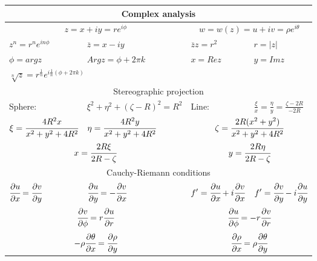 \begin{tabular}{l|l|l|l}
	\multicolumn{4}{c}{Complex analysis} \\
	\hline 
	
	\multicolumn{2}{c}{$\displaystyle z = x+iy = re^{i\phi}$}  &
	\multicolumn{2}{c}{$\displaystyle w = w(z) = u + iv = \rho e^{i\theta}$}  \\
	\hline
	
	$\displaystyle z^n = r^ne^{in\phi}$ &
	$\displaystyle \overline{z} = x - iy$ &
	$\displaystyle \overline{z}z = r^2$ &
	$\displaystyle r = |z|$ \\
	
	$\displaystyle \phi = {arg}z$ &
	$\displaystyle Argz = \phi + 2\pi k$ &
	$\displaystyle x = Rez$ &
	$\displaystyle y = Imz$ \\
	
	\multicolumn{4}{l}{$\displaystyle \sqrt[n]{z} = r^{\frac{1}{n}}e^{i\frac{1}{n}(\phi+2\pi k)}$} \\
	\hline
	
	\multicolumn{4}{c}{Stereographic projection} \\
	
	Sphere: & $\displaystyle \xi^2 + \eta^2+(\zeta - R)^2 = R^2$ &
	Line: & $\displaystyle \frac{\xi}{x} = \frac{\eta}{y} = \frac{\zeta - 2R}{-2R}$ \\
	
	$\displaystyle \xi = \cfrac{4R^2x}{x^2+y^2+4R^2}$ &
	$\displaystyle \eta = \cfrac{4R^2y}{x^2+y^2+4R^2}$ &
	\multicolumn{2}{c}{$\displaystyle \zeta = \cfrac{2R(x^2+y^2)}{x^2+y^2+4R^2}$} \\
	
	\multicolumn{2}{c}{$\displaystyle x = \cfrac{2R\xi}{2R-\zeta}$} &
	\multicolumn{2}{c}{$\displaystyle y = \cfrac{2R\eta}{2R-\zeta}$} \\
	\hline
	
	\multicolumn{4}{c}{Cauchy-Riemann conditions} \\
	
	$\displaystyle \cfrac{\partial u}{\partial x} = \cfrac{\partial v}{\partial y}$ &
	$\displaystyle \cfrac{\partial u}{\partial y} = -\cfrac{\partial v}{\partial x}$ &
	$\displaystyle f'=\cfrac{\partial u}{\partial x} + i\cfrac{\partial v}{\partial x}$ &
	$\displaystyle f' = \cfrac{\partial v}{\partial y} - i\cfrac{\partial u}{\partial y}$ \\
	\hline
	
	\multicolumn{2}{c}{$\displaystyle \cfrac{\partial v}{\partial \phi} = r\cfrac{\partial u}{\partial r}$} &
	\multicolumn{2}{c}{$\displaystyle \cfrac{\partial u}{\partial \phi} = -r \cfrac{\partial v}{\partial r}$} \\
	\hline
	
	\multicolumn{2}{c}{$\displaystyle -\rho\cfrac{\partial \theta}{\partial x} = \cfrac{\partial \rho}{\partial y}$} &
	\multicolumn{2}{c}{$\displaystyle \cfrac{\partial \rho}{\partial x} = \rho \cfrac{\partial \theta}{\partial y}$} \\
\end{tabular}